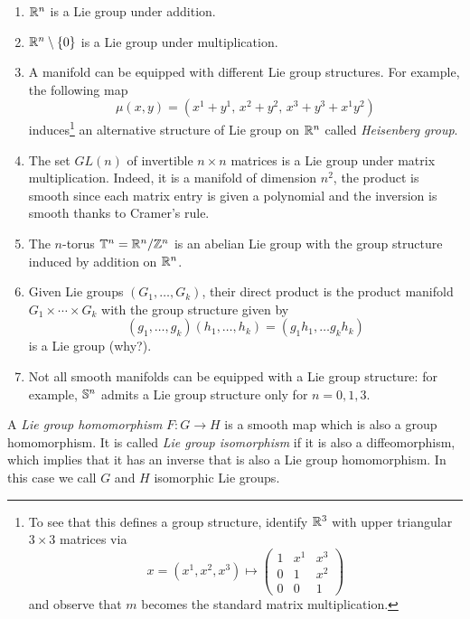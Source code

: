 \begin{example}
  \begin{enumerate}
    \item $\mathbb{R}^n$ is a Lie group under addition.
    \item $\mathbb{R}^n\setminus\{0\}$ is a Lie group under multiplication.
    \item A manifold can be equipped with different Lie group structures. For example, the following map
    \begin{equation}
      \mu(x,y) = (x^1+y^1,\, x^2+y^2,\, x^3+y^3+x^1y^2)
    \end{equation}
    induces\footnote{To see that this defines a group structure, identify $\mathbb{R}^3$ with upper triangular $3\times3$ matrices via
    \begin{equation}\nonumber
      x = (x^1, x^2, x^3) \mapsto \begin{pmatrix}
        1 & x^1 & x^3\\
        0 & 1 & x^2 \\
        0 & 0 & 1
      \end{pmatrix}
    \end{equation}
    and observe that $m$ becomes the standard matrix multiplication.} an alternative structure of Lie group on $\mathbb{R}^n$ called \emph{Heisenberg group}.
    \item The set $GL(n)$ of invertible $n\times n$ matrices is a Lie group under matrix multiplication. Indeed, it is a manifold of dimension $n^2$, the product is smooth since each matrix entry is given a polynomial and the inversion is smooth thanks to Cramer's rule.
    \item The $n$-torus $\mathbb{T}^n = \mathbb{R}^n/\mathbb{Z}^n$ is an abelian Lie group with the group structure induced by addition on $\mathbb{R}^n$.
    \item Given Lie groups $(G_1, \ldots, G_k)$, their direct product is the product manifold $G_1\times \cdots\times G_k$ with the group structure given by
    \begin{equation}
      (g_1, \ldots, g_k)(h_1,\ldots,h_k) = (g_1h_1, \ldots g_kh_k)
    \end{equation}
    is a Lie group (why?).
    \item Not all smooth manifolds can be equipped with a Lie group structure: for example, $\mathbb{S}^n$ admits a Lie group structure only for $n=0,1,3$.
  \end{enumerate}
\end{example}

\begin{definition}
  A \emph{Lie group homomorphism} $F:G\to H$ is a smooth map which is also a group homomorphism. It is called \emph{Lie group isomorphism} if it is also a diffeomorphism, which implies that it has an inverse that is also a Lie group homomorphism. In this case we call $G$ and $H$ isomorphic Lie groups.
\end{definition}

